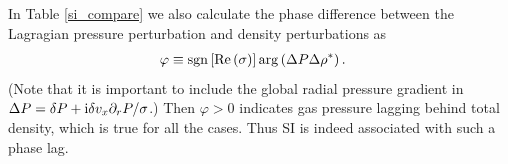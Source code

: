 

In Table \ref{si_compare} we also calculate the phase difference
between the Lagragian pressure perturbation and density perturbations
as    
\begin{align*} 
\varphi&\equiv \operatorname{sgn}{\left[\operatorname{Re}{(\sigma)}\right]}\arg\left(\Delta
  P\Delta\rho^*\right).\notag 
\end{align*}
(Note that it is important to include 
the global radial pressure gradient in $\Delta P = \delta P + \mathrm{i} \delta v_x \partial_rP/\sigma$.) Then 
$\varphi > 0 $ indicates gas pressure lagging behind total density, 
which is true for all the cases. Thus SI is indeed associated with
such a phase lag.






